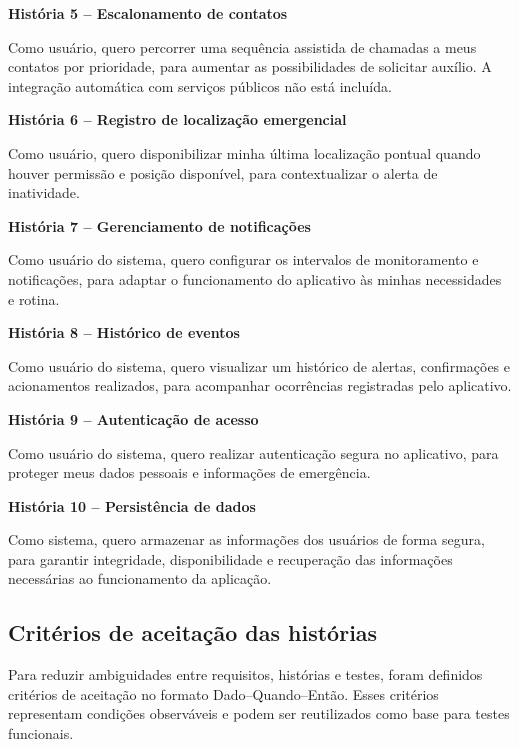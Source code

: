 \bigskip

\textbf{História 5 – Escalonamento de contatos}

Como usuário, quero percorrer uma sequência assistida de chamadas a meus contatos por prioridade, para aumentar as possibilidades de solicitar auxílio. A integração automática com serviços públicos não está incluída.

\bigskip

\textbf{História 6 – Registro de localização emergencial}

Como usuário, quero disponibilizar minha última localização pontual quando houver permissão e posição disponível, para contextualizar o alerta de inatividade.

\bigskip

\textbf{História 7 – Gerenciamento de notificações}

Como usuário do sistema, quero configurar os intervalos de monitoramento e notificações, para adaptar o funcionamento do aplicativo às minhas necessidades e rotina.

\bigskip

\textbf{História 8 – Histórico de eventos}

Como usuário do sistema, quero visualizar um histórico de alertas, confirmações e acionamentos realizados, para acompanhar ocorrências registradas pelo aplicativo.

\bigskip

\textbf{História 9 – Autenticação de acesso}

Como usuário do sistema, quero realizar autenticação segura no aplicativo, para proteger meus dados pessoais e informações de emergência.

\bigskip

\textbf{História 10 – Persistência de dados}

Como sistema, quero armazenar as informações dos usuários de forma segura, para garantir integridade, disponibilidade e recuperação das informações necessárias ao funcionamento da aplicação.


\subsection{Critérios de aceitação das histórias}

Para reduzir ambiguidades entre requisitos, histórias e testes, foram definidos critérios de aceitação no formato Dado--Quando--Então. Esses critérios representam condições observáveis e podem ser reutilizados como base para testes funcionais.

